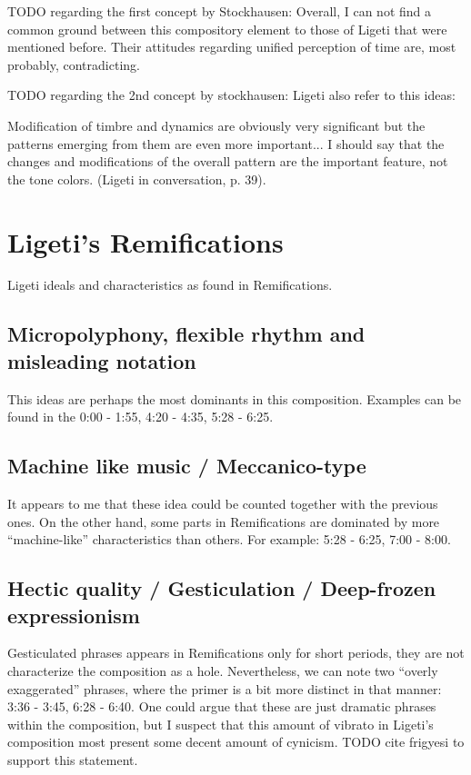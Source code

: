 \documentclass[a4paper,11pt]{article}
\newenvironment{MyShadequote}[1][]{%
    \ignorespaces%
    \begin{mdframed}[style=MyShadeQuoteStyle,#1]%
}{%
    \end{mdframed}%
    \ignorespacesafterend%
}%
\begin{document}
TODO regarding the first concept by Stockhausen:
Overall, I can not find a common ground between this compository element to those of Ligeti that were mentioned before.
Their attitudes regarding unified perception of time are, most probably, contradicting.

TODO regarding the 2nd concept by stockhausen:
Ligeti also refer to this ideas:

\begin{MyShadequote}
  Modification of timbre and dynamics are obviously very significant but the patterns emerging from them are even more important...
  I should say that the changes and modifications of the overall pattern are the important feature, not the tone colors. (Ligeti in conversation, p. 39).
\end{MyShadequote}

\section{Ligeti's Remifications}
\label{sub:ramifications}

Ligeti ideals and characteristics as found in Remifications.

\subsection*{Micropolyphony, flexible rhythm and misleading notation}

This ideas are perhaps the most dominants in this composition.
Examples can be found in the 0:00 - 1:55, 4:20 - 4:35, 5:28 - 6:25.

\subsection*{Machine like music / Meccanico-type}

It appears to me that these idea could be counted together with the previous ones.
On the other hand, some parts in Remifications are dominated by more ``machine-like'' characteristics than others.
For example: 5:28 - 6:25, 7:00 - 8:00.

\subsection*{Hectic quality / Gesticulation / Deep-frozen expressionism}

Gesticulated phrases appears in Remifications only for short periods, they are not characterize the composition as a hole.
Nevertheless, we can note two ``overly exaggerated'' phrases, where the primer is a bit more distinct in that manner: 3:36 - 3:45, 6:28 - 6:40.
One could argue that these are just dramatic phrases within the composition, but I suspect that this amount of vibrato in Ligeti's composition most present some decent amount of cynicism.
TODO cite frigyesi to support this statement.
\end{document}
